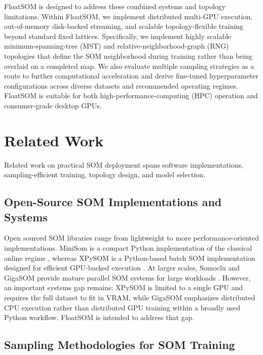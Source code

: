 \documentclass[11pt]{article}
\begin{document}
FloatSOM is designed to address these combined systems and topology limitations. Within FloatSOM, we implement distributed multi-GPU execution, out-of-memory disk-backed streaming, and scalable topology-flexible training beyond standard fixed lattices. Specifically, we implement highly scalable minimum-spanning-tree (MST) and relative-neighborhood-graph (RNG) topologies that define the SOM neighborhood during training rather than being overlaid on a completed map. We also evaluate multiple sampling strategies as a route to further computational acceleration and derive fine-tuned hyperparameter configurations across diverse datasets and recommended operating regimes. FloatSOM is suitable for both high-performance-computing (HPC) operation and consumer-grade desktop GPUs.

\section{Related Work}

Related work on practical SOM deployment spans software implementations, sampling-efficient training, topology design, and model selection.

\subsection{Open-Source SOM Implementations and Systems}

Open sourced SOM libraries range from lightweight to more performance-oriented implementations. MiniSom is a compact Python implementation of the classical online regime \citep{vettigliJustGlowingMinisom2018}, whereas XPySOM is a Python-based batch SOM implementation designed for efficient GPU-backed execution \citep{manciniXPySomHighPerformanceSelfOrganizing2020}. At larger scales, Somoclu and GigaSOM provide mature parallel SOM systems for large workloads \citep{wittekSomocluEfficientParallel2017,kratochvilGigaSOMjlHighperformanceClustering2020}. However, an important systems gap remains: XPySOM is limited to a single GPU and requires the full dataset to fit in VRAM, while GigaSOM emphasizes distributed CPU execution rather than distributed GPU training within a broadly used Python workflow. FloatSOM is intended to address that gap.

\subsection{Sampling Methodologies for SOM Training}
\end{document}

